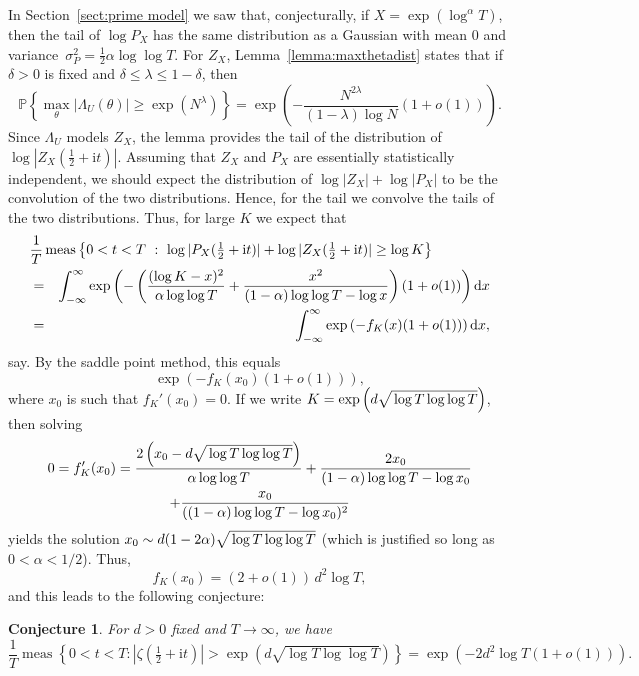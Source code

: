 \documentclass[10pt,reqno,twoside]{amsart}
\renewcommand{\d}{{\mathrm{d}}} %
\renewcommand{\i}{{\mathrm{i}}} %
\newcommand{\Prob}{\mathbb{P}}
\DeclareMathOperator{\meas}{meas}
\def\({\left(}
\def\){\right)}
\newtheorem{conj}{Conjecture}
\numberwithin{equation}{section}
\numberwithin{theorem}{section}
\begin{document}
{{In Section~\ref{sect:prime model} we saw that, conjecturally, if
$X=\exp(\log^\alpha T)$, then the tail of  $\log P_X$ has
the same  distribution as a Gaussian with mean 0 and
variance~$\sigma^2_P=\frac12 \alpha \log\log T$.  For $Z_X$,
Lemma~\ref{lemma:maxthetadist} states that if $\delta>0$ is fixed
and $\delta\le \lambda \le 1-\delta$, then
\begin{equation}
\Prob\left\{ \max_\theta |\Lambda_{U}(\theta)| \geq
\exp(N^\lambda) \right\} = \exp\left(-\frac{N^{2\lambda}}{
(1-\lambda) \log N} (1+o(1))\right) .
\end{equation}
Since $\Lambda_{U}$ models $Z_X$, the lemma provides the tail of
the distribution of $\log|Z_X(\tfrac12+\i t)|$. Assuming that
$ Z_X $ and $ P_X $ are essentially statistically independent,
we should expect the distribution
of  $\log|Z_X| + \log|P_X|$ to be the convolution of the two
distributions. Hence, for the tail we  convolve the
tails of the two distributions. Thus, for large $K$ we expect that
\begin{eqnarray}\label{eqn:convolution}
\lefteqn{\frac{1}{T} \meas\left\{ 0 < t < T \ : \
    \log |P_X(\tfrac{1}{2}+\i t)| + \log|Z_X(\tfrac{1}{2}+\i t)|\geq
\log K \right\} } \cr
 &=& \int_{-\infty}^\infty
\exp\left(-\(\frac{(\log K-x)^2}{\alpha\log\log T} +
    \frac{x^2}{(1-\alpha)\log\log T - \log x}\)
(1+o(1))\right) \d x \cr
 & =& \int_{-\infty}^\infty
\exp\left(- f_K(x) (1+o(1))\right) \d x ,
\end{eqnarray}
say.
By the saddle point method, this equals
\begin{equation}
\exp\left(- f_K(x_0)
(1+o(1))\right) ,
\end{equation}
where $x_0$ is such that $f_K'(x_0)=0$.
If we
write $K = \exp\left(d\sqrt{\mathstrut \log T \log\log
T}\right)$, then solving
\begin{multline}
0=f_K'(x_0) = \frac{2\left(x_0-d\sqrt{\mathstrut \log T \log\log
T}\right)}{\alpha \log\log T} +
\frac{2x_0}{(1-\alpha)\log\log T - \log x_0} \\
+ \frac{x_0}{((1-\alpha)\log\log T - \log x_0)^2}
\end{multline}
yields the solution $x_0 \sim d (1-2\alpha)\sqrt{\mathstrut \log T \log\log
T}$ (which is justified so long as $0<\alpha<1/2$).
Thus,
\begin{equation}
f_K(x_0) =  (2+o(1))\, d^2\log T  ,
\end{equation}
and this leads to the following conjecture:
\begin{conj}
For $d>0$ fixed and $T\to\infty$, we have
\begin{equation}
\frac{1}{T} \meas \left\{ 0<t<T  :  |\zeta(\tfrac12+\i t)| >
\exp(d \sqrt{\log T \log\log T}) \right\}   =    \exp\left( -2d^2
\log T (1 + o(1)) \right) .
\end{equation}
\end{conj}

}}
\end{document}
